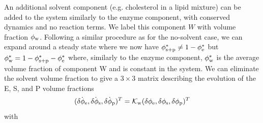 An additional solvent component (e.g. cholesterol in a lipid mixture) can be added to the system similarly to the enzyme component, with conserved dynamics and no reaction terms. We label this component $W$ with volume fraction $\phi_{\mathrm{w}}$. Following a similar procedure as for the no-solvent case, we can expand around a steady state where we now have $\phi_{\mathrm{s+p}}^* \neq 1 - \phi_{\mathrm{e}}^*$ but $\phi_{\mathrm{w}}^* = 1 - \phi_{\mathrm{s+p}}^* - \phi_{\mathrm{e}}^*$ where, similarly to the enzyme component, $\phi_{\mathrm{w}}^*$ is the average volume fraction of component W and is constant in the system. We can eliminate the solvent volume fraction to give a $3\times3$ matrix describing the evolution of the E, S, and P volume fractions
\begin{equation}
    (\dot{\delta\phi_{\mathrm{e}}}, \dot{\delta\phi_{\mathrm{s}}}, \dot{\delta\phi_{\mathrm{p}}})^T = {\cal K}_{\rm w}(\delta\phi_{\mathrm{e}}, \delta\phi_{\mathrm{s}}, \delta\phi_{\mathrm{p}})^T    
\end{equation}
with
\newline
\noindent
{}


